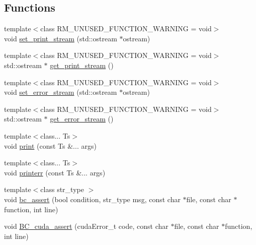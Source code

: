 \subsection*{Functions}
\begin{DoxyCompactItemize}
\item 
{\footnotesize template$<$class R\+M\+\_\+\+U\+N\+U\+S\+E\+D\+\_\+\+F\+U\+N\+C\+T\+I\+O\+N\+\_\+\+W\+A\+R\+N\+I\+NG  = void$>$ }\\void \hyperlink{namespacebc_a0990b0a9f4f36164af3631f2ab4ce0ab}{set\+\_\+print\+\_\+stream} (std\+::ostream $\ast$ostream)
\item 
{\footnotesize template$<$class R\+M\+\_\+\+U\+N\+U\+S\+E\+D\+\_\+\+F\+U\+N\+C\+T\+I\+O\+N\+\_\+\+W\+A\+R\+N\+I\+NG  = void$>$ }\\std\+::ostream $\ast$ \hyperlink{namespacebc_ad2f1d49225b5a0a25966864b54af8552}{get\+\_\+print\+\_\+stream} ()
\item 
{\footnotesize template$<$class R\+M\+\_\+\+U\+N\+U\+S\+E\+D\+\_\+\+F\+U\+N\+C\+T\+I\+O\+N\+\_\+\+W\+A\+R\+N\+I\+NG  = void$>$ }\\void \hyperlink{namespacebc_ad394a7001658f17912a9facdef966740}{set\+\_\+error\+\_\+stream} (std\+::ostream $\ast$ostream)
\item 
{\footnotesize template$<$class R\+M\+\_\+\+U\+N\+U\+S\+E\+D\+\_\+\+F\+U\+N\+C\+T\+I\+O\+N\+\_\+\+W\+A\+R\+N\+I\+NG  = void$>$ }\\std\+::ostream $\ast$ \hyperlink{namespacebc_a65f60b6b1712dcfdbd44d05873c98afe}{get\+\_\+error\+\_\+stream} ()
\item 
{\footnotesize template$<$class... Ts$>$ }\\void \hyperlink{namespacebc_ae22a53f8f6cd6e96082822fa69f5e97e}{print} (const Ts \&... args)
\item 
{\footnotesize template$<$class... Ts$>$ }\\void \hyperlink{namespacebc_aa0e5d3f520d36704b31391c582e31959}{printerr} (const Ts \&... args)
\item 
{\footnotesize template$<$class str\+\_\+type $>$ }\\void \hyperlink{namespacebc_abd3d44d6c60359e43ce37fb8983291bf}{bc\+\_\+assert} (bool condition, str\+\_\+type msg, const char $\ast$file, const char $\ast$function, int line)
\item 
void \hyperlink{namespacebc_ae9d727e5d33877f786a3942677806c5b}{B\+C\+\_\+cuda\+\_\+assert} (cuda\+Error\+\_\+t code, const char $\ast$file, const char $\ast$function, int line)
\item 

\end{DoxyCompactItemize}
